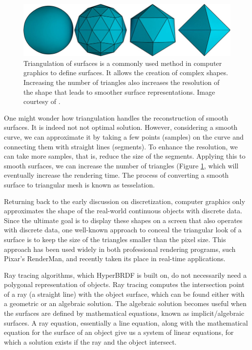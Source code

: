 \begin{figure}
  \centering
   \includegraphics[width=0.7\linewidth]{Images/Triangulation-of-surfaces-Any-curved-surface-in-this-case-a-sphere-can-be-approximated.png}
   \caption{Triangulation of surfaces is a commonly used method in computer graphics to define surfaces. It allows the creation of complex shapes. Increasing the number of triangles also increases the resolution of the shape that leads to smoother surface representations. Image courtesy of \citeauthor{triangulation} \cite{triangulation}.}
   \label{fig:triangulation}
\end{figure}

One might wonder how triangulation handles the reconstruction of smooth surfaces. It is indeed not not optimal solution. However, considering a smooth curve, we can approximate it by taking a few points (samples) on the curve and connecting them with straight lines (segments). To enhance the resolution, we can take more samples, that is, reduce the size of the segments. Applying this to smooth surfaces, we can increase the number of triangles (Figure \ref{fig:triangulation}, which will eventually increase the rendering time. The process of converting a smooth surface to triangular mesh is known as tesselation.


Returning back to the early discussion on discretization, computer graphics only approximates the shape of the real-world continuous objects with discrete data. Since the ultimate goal is to display these shapes on a screen that also operates with discrete data, one well-known approach to conceal the triangular look of a surface is to keep the size of the triangles smaller than the pixel size. This approach has been used widely in both professional rendering programs, such Pixar's RenderMan, and recently taken its place in real-time applications.

Ray tracing algorithms, which HyperBRDF is built on, do not necessarily need a polygonal representation of objects. Ray tracing computes the intersection point of a ray (a straight line) with the object surface, which can be found either with a geometric or an algebraic solution. The algebraic solution becomes useful when the surfaces are defined by mathematical equations, known as implicit/algebraic surfaces. A ray equation, essentially a line equation, along with the mathematical equation for the surface of an object give us a system of linear equations, for which a solution exists if the ray and the object intersect.

